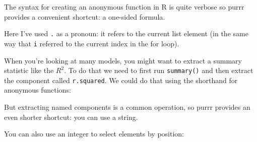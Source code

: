 \documentclass[]{book}
\newenvironment{Shaded}{\begin{snugshade}}{\end{snugshade}}
\newcommand{\KeywordTok}[1]{\textcolor[rgb]{0.13,0.29,0.53}{\textbf{{#1}}}}
\newcommand{\DataTypeTok}[1]{\textcolor[rgb]{0.13,0.29,0.53}{{#1}}}
\newcommand{\DecValTok}[1]{\textcolor[rgb]{0.00,0.00,0.81}{{#1}}}
\newcommand{\StringTok}[1]{\textcolor[rgb]{0.31,0.60,0.02}{{#1}}}
\newcommand{\CommentTok}[1]{\textcolor[rgb]{0.56,0.35,0.01}{\textit{{#1}}}}
\newcommand{\NormalTok}[1]{{#1}}
\begin{document}
The syntax for creating an anonymous function in R is quite verbose so
purrr provides a convenient shortcut: a one-sided formula.

\begin{Shaded}
\end{Shaded}

Here I've used \texttt{.} as a pronoun: it refers to the current list
element (in the same way that \texttt{i} referred to the current index
in the for loop).

When you're looking at many models, you might want to extract a summary
statistic like the \(R^2\). To do that we need to first run
\texttt{summary()} and then extract the component called
\texttt{r.squared}. We could do that using the shorthand for anonymous
functions:

\begin{Shaded}
\end{Shaded}

But extracting named components is a common operation, so purrr provides
an even shorter shortcut: you can use a string.

\begin{Shaded}
\end{Shaded}

You can also use an integer to select elements by position:

\begin{Shaded}
\end{Shaded}
\end{document}
